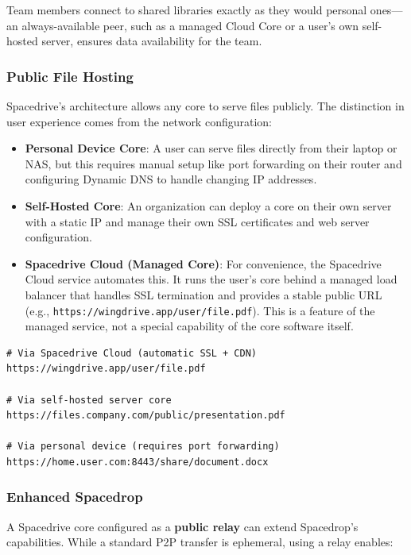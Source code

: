\documentclass[sigconf]{acmart}
\begin{document}
Team members connect to shared libraries exactly as they would personal ones—an always-available peer, such as a managed Cloud Core or a user's own self-hosted server, ensures data availability for the team.

\subsubsection{Public File Hosting}

Spacedrive's architecture allows any core to serve files publicly. The distinction in user experience comes from the network configuration:

\begin{itemize}
    \item \textbf{Personal Device Core}: A user can serve files directly from their laptop or NAS, but this requires manual setup like port forwarding on their router and configuring Dynamic DNS to handle changing IP addresses.
    \item \textbf{Self-Hosted Core}: An organization can deploy a core on their own server with a static IP and manage their own SSL certificates and web server configuration.
    \item \textbf{Spacedrive Cloud (Managed Core)}: For convenience, the Spacedrive Cloud service automates this. It runs the user's core behind a managed load balancer that handles SSL termination and provides a stable public URL (e.g., \texttt{https://\allowbreak wingdrive.app/\allowbreak user/\allowbreak file.pdf}). This is a feature of the managed service, not a special capability of the core software itself.
\end{itemize}

\begin{lstlisting}[style=shellstyle, language=text, caption=Public sharing URL examples]
# Via Spacedrive Cloud (automatic SSL + CDN)
https://wingdrive.app/user/file.pdf

# Via self-hosted server core
https://files.company.com/public/presentation.pdf

# Via personal device (requires port forwarding)
https://home.user.com:8443/share/document.docx
\end{lstlisting}

\subsubsection{Enhanced Spacedrop}

A Spacedrive core configured as a \textbf{public relay} can extend Spacedrop's capabilities. While a standard P2P transfer is ephemeral, using a relay enables:
\end{document}
